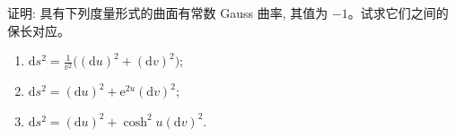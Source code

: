 \documentclass[../../main.tex]{subfiles}%
\begin{document}
\begin{example}
证明: 具有下列度量形式的曲面有常数 Gauss 曲率, 其值为 $-1$。试求它们之间的保长对应。
\begin{enumerate}[(1)]
\item $\mathrm{d}s^2=\frac{1}{v^2}\big((\mathrm{d}u)^2+(\mathrm{d}v)^2\big)$;
\item $\mathrm{d}s^2=(\mathrm{d}u)^2+\mathrm{e}^{2u}(\mathrm{d}v)^2$;
\item $\mathrm{d}s^2=(\mathrm{d}u)^2+\cosh^2 u(\mathrm{d}v)^2$.
\end{enumerate}
\end{example}
\end{document}
